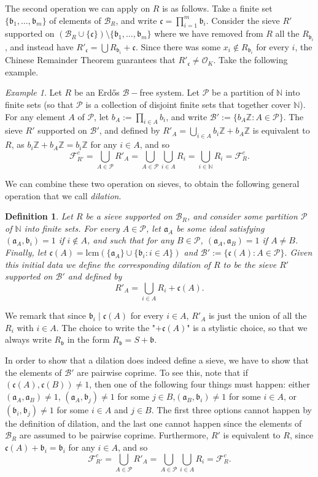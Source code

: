 \documentclass[a4paper,11pt,reqno]{amsart}
\theoremstyle{plain}
\newtheorem{definition}[theorem]{Definition}
\theoremstyle{remark}
\newtheorem{example}[theorem]{Example}
\newcommand{\z}{\mathbb{Z}}
\newcommand{\cb}{\mathcal{B}}
\newcommand{\co}{\mathcal{O}}
\newcommand{\cp}{\mathcal{P}}
\newcommand{\fr}{\mathcal{F}_R}
\newcommand{\frp}{\mathcal{F}_{R'}}
\newcommand{\ga}{\mathfrak{a}}
\newcommand{\gb}{\mathfrak{b}}
\newcommand{\gc}{\mathfrak{c}}
\begin{document}
		The second operation we can apply on $R$ is as follows. Take a finite set $\{\gb_1,\dots,\gb_m\}$ of elements of $\cb_R$, and write $\gc = \prod_{i=1}^m \gb_i.$ Consider the sieve $R'$ supported on $(\cb_R\cup \{\gc\}) \setminus \{\gb_1,\dots,\gb_m\}$ where we have removed from $R$ all the $R_{\gb_i}$, and instead have $R'_\gc = \bigcup R_{\gb_i} + \gc$. Since there was some $x_i \not \in R_{\gb_i}$ for every $i$, the Chinese Remainder Theorem guarantees that $R'_\gc \neq \co_K$. Take the following example.
		
		\begin{example}
			Let $R$ be an Erdős $\cb-$free system. Let $\cp$ be a partition of $\mathbb{N}$ into finite sets (so that $\cp$ is a collection of disjoint finite sets that together cover $\mathbb{N}$). For any element $A$ of $\cp$, let $b_A := \prod_{i\in A}b_i$, and write  $\cb' := \{ b_A \z: A \in \cp \}$. The sieve $R'$ supported on $\cb'$, and defined by $R'_A = \bigcup_{i\in A} b_i\z + b_A\z$ is equivalent to $R$, as $ b_i\z + b_A\z = b_i\z$ for any $i \in A$, and so $$ \frp^c = \bigcup_{A \in \cp} R'_A = \bigcup_{A \in \cp} \bigcup_{i\in A}  R_i = \bigcup_{i \in \mathbb{N}} R_i = \fr^c. $$
		\end{example}
		
		
		
		We can combine these two operation on sieves, to obtain the following general operation that we call  \textit{dilation}. 
		
		\begin{definition}
			\label{def: dilation}
			Let $R$ be a sieve supported on $\cb_R$, and consider some partition $\cp$ of $\mathbb{N}$ into finite sets. For every $A \in \cp$, let $\ga_A$ be some ideal satisfying $(\ga_A,\gb_i) =1$ if $i \not \in A$, and such that for any $B \in \cp$, $(\ga_A,\ga_B) =1$ if $A\neq B$. Finally, let $\gc(A) = \text{lcm}(\{\ga_A\}\cup\{\gb_i:i\in A\})$ and $\cb' := \{\gc(A): A \in \cp \}.$ Given this initial data we define the corresponding dilation of $R$ to be the sieve $R'$ supported on $\cb'$ and defined by $$R'_A = \bigcup_{i \in A} R_i + \gc(A).$$
		\end{definition}
		
		We remark that since $\gb_i \mid \gc(A)$ for every $i \in A$, $R'_A$ is just the union of all the $R_i$ with $i \in A$. The choice to write the "$+ \gc(A)$" is a stylistic choice, so that we always write $R_\gb$ in the form $R_\gb = S + \gb$.
		
		In order to show that a dilation does indeed define a sieve, we have to show that the elements of $\cb'$ are pairwise coprime. To see this, note that if $(\gc(A),\gc(B)) \neq 1$, then one of the following four things must happen: either $(\ga_A,\ga_B) \neq 1$, $(\ga_A, \gb_j) \neq 1$ for some $j \in B$,$(\ga_B, \gb_i) \neq 1$ for some $i \in A$, or $(\gb_i, \gb_j) \neq 1$ for some $i \in A$ and $j \in B$. The first three options cannot happen by the definition of dilation, and the last one cannot happen since the elements of $\cb_R$ are assumed to be pairwise coprime. Furthermore, $R'$ is equivalent to $R$, since $\gc(A) + \gb_i = \gb_i$ for any $i \in A$, and so $$\frp^c = \bigcup_{A \in \cp }  R'_A =  \bigcup_{A \in \cp } \bigcup_{i \in A }  R_i = \fr^c.$$
		
\end{document}
